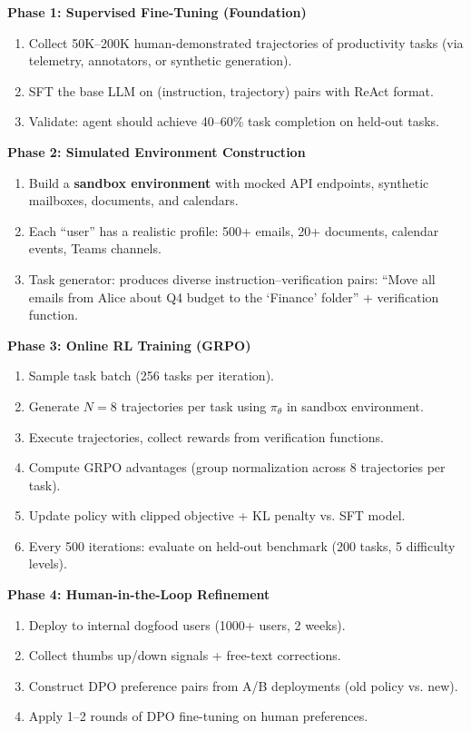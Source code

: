 \begin{keybox}
\textbf{Phase 1: Supervised Fine-Tuning (Foundation)}

\begin{enumerate}
  \item Collect 50K--200K human-demonstrated trajectories of productivity tasks (via telemetry, annotators, or synthetic generation).
  \item SFT the base LLM on (instruction, trajectory) pairs with ReAct format.
  \item Validate: agent should achieve 40--60\% task completion on held-out tasks.
\end{enumerate}

\textbf{Phase 2: Simulated Environment Construction}

\begin{enumerate}
  \item Build a \textbf{sandbox environment} with mocked API endpoints, synthetic mailboxes, documents, and calendars.
  \item Each ``user'' has a realistic profile: 500+ emails, 20+ documents, calendar events, Teams channels.
  \item Task generator: produces diverse instruction--verification pairs: ``Move all emails from Alice about Q4 budget to the ‘Finance’ folder'' + verification function.
\end{enumerate}

\textbf{Phase 3: Online RL Training (GRPO)}

\begin{enumerate}
  \item Sample task batch (256 tasks per iteration).
  \item Generate $N=8$ trajectories per task using $\pi_\theta$ in sandbox environment.
  \item Execute trajectories, collect rewards from verification functions.
  \item Compute GRPO advantages (group normalization across 8 trajectories per task).
  \item Update policy with clipped objective + KL penalty vs. SFT model.
  \item Every 500 iterations: evaluate on held-out benchmark (200 tasks, 5 difficulty levels).
\end{enumerate}

\textbf{Phase 4: Human-in-the-Loop Refinement}

\begin{enumerate}
  \item Deploy to internal dogfood users (1000+ users, 2 weeks).
  \item Collect thumbs up/down signals + free-text corrections.
  \item Construct DPO preference pairs from A/B deployments (old policy vs. new).
  \item Apply 1--2 rounds of DPO fine-tuning on human preferences.
\end{enumerate}
\end{keybox}

